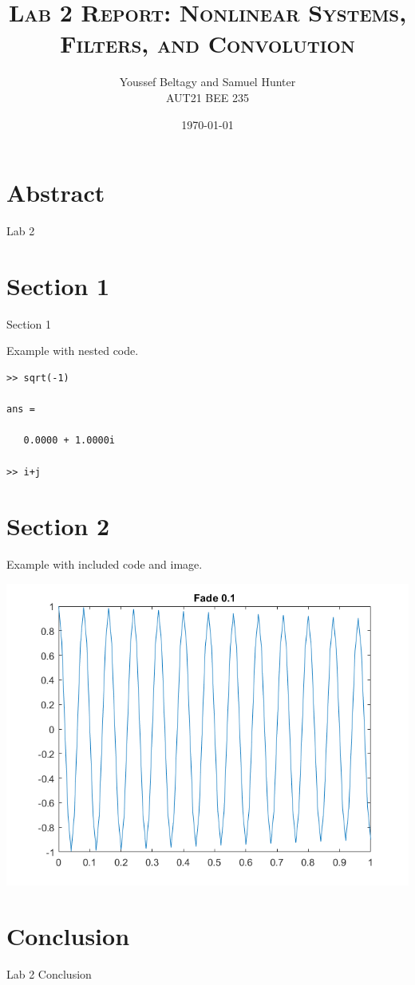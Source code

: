 \documentclass[11pt]{article}
\title{
    \textsc{Lab 2 Report: Nonlinear Systems, Filters, and Convolution}
}
\author{
    \Large{Youssef Beltagy and Samuel Hunter} \\
    \large \textsc{AUT21 BEE 235}
}
\date{\today}
\begin{document}
\maketitle %
\pagebreak 


\section{Abstract}

Lab 2

\section{Section 1}

Section 1


Example with nested code.

\begin{lstlisting}
>> sqrt(-1)

ans =

   0.0000 + 1.0000i

>> i+j
\end{lstlisting}


\pagebreak
\section{Section 2}

Example with included code and image.



\includegraphics[width=\textwidth]{example_delete_me.png}

\section{Conclusion}

Lab 2 Conclusion
\end{document}
